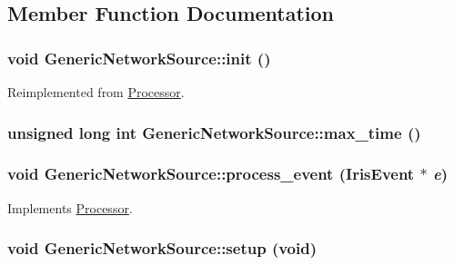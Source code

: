 \subsection{Member Function Documentation}
\hypertarget{classGenericNetworkSource_e875a5cd3f60bd3073812f747c80409e}{
\subsubsection[{init}]{\setlength{\rightskip}{0pt plus 5cm}void GenericNetworkSource::init ()}}
\label{classGenericNetworkSource_e875a5cd3f60bd3073812f747c80409e}




Reimplemented from \hyperlink{classProcessor_22e869ee49d974ad0ee7ee81961ab88f}{Processor}.\hypertarget{classGenericNetworkSource_a1970b5e7d100e15d282f03358c8ce70}{
\subsubsection[{max\_\-time}]{\setlength{\rightskip}{0pt plus 5cm}unsigned long int GenericNetworkSource::max\_\-time ()}}
\label{classGenericNetworkSource_a1970b5e7d100e15d282f03358c8ce70}


\hypertarget{classGenericNetworkSource_a67be5ac0f97b7e0b38eba909cecaa64}{
\subsubsection[{process\_\-event}]{\setlength{\rightskip}{0pt plus 5cm}void GenericNetworkSource::process\_\-event ({\bf IrisEvent} $\ast$ {\em e})}}
\label{classGenericNetworkSource_a67be5ac0f97b7e0b38eba909cecaa64}




Implements \hyperlink{classProcessor_18cdeefafbd8225cb3ad18dd098c0e08}{Processor}.\hypertarget{classGenericNetworkSource_a1390d4685120020d9b9564ee19df854}{
\subsubsection[{setup}]{\setlength{\rightskip}{0pt plus 5cm}void GenericNetworkSource::setup (void)}}
\label{classGenericNetworkSource_a1390d4685120020d9b9564ee19df854}





